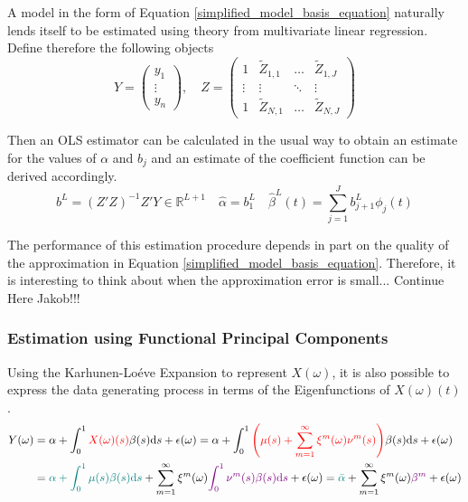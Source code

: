 \documentclass[11pt,twoside,a4paper]{article}
\begin{document}
	A model in the form of Equation \ref{simplified_model_basis_equation} naturally lends itself to be estimated using theory from multivariate linear regression. Define therefore the following objects
	\begin{equation}\label{regressor_mat_1}
		Y = \begin{pmatrix}
			y_1 \\ \vdots \\ y_n
		\end{pmatrix}, \quad
		Z = \begin{pmatrix}
			1 & \tilde{Z}_{1,1} & \dots & \tilde{Z}_{1,J} \\
			\vdots & \vdots & \ddots & \vdots \\
			1 & \tilde{Z}_{N,1} & \dots & \tilde{Z}_{N,J}
		\end{pmatrix}
	\end{equation}
	
	Then an OLS estimator can be calculated in the usual way to obtain an estimate for the values of $\alpha$ and $b_j$ and an estimate of the coefficient function can be derived accordingly.
	\begin{equation}
		b^L = \left(Z'Z\right)^{-1}Z'Y \in \mathbb{R}^{L+1} \quad \hat{\alpha} = b_{1}^{L} \quad \hat{\beta}^L(t) = \sum_{j = 1}^{J} b_{j+1}^L \phi_j(t)
	\end{equation}

	The performance of this estimation procedure depends in part on the quality of the approximation in Equation \ref{simplified_model_basis_equation}. Therefore, it is interesting to think about when the approximation error is small... {\color{red}Continue Here Jakob!!!}
	
	\subsubsection{Estimation using Functional Principal Components}\label{fpc_exp_transf}
	
	Using the Karhunen-Lo\'{e}ve Expansion to represent $X(\omega)$, it is also possible to express the data generating process in terms of the Eigenfunctions of $X(\omega)(t)$.
	\begin{equation}
		\begin{split}
			Y(\omega) &= \alpha + \int_{0}^{1} {\color{red}X(\omega)(s)} \beta(s) \mathrm{d}s + \epsilon(\omega)
			= \alpha + \int_{0}^{1} {\color{red}\left(\mu(s) + \sum_{m = 1}^{\infty} \xi^m(\omega) \nu^m(s)\right)} \beta(s) \mathrm{d}s + \epsilon(\omega)\\
			&= {\color{teal}\alpha + \int_{0}^{1} \mu(s) \beta(s) \mathrm{d}s} + \sum_{m = 1}^{\infty} \xi^m(\omega) {\color{violet}\int_{0}^{1} \nu^m(s) \beta(s) \mathrm{d}s} + \epsilon(\omega)
			= {\color{teal}\bar{\alpha}} + \sum_{m = 1}^{\infty} \xi^m(\omega) {\color{violet}\beta^m} + \epsilon(\omega)
		\end{split}
	\end{equation}
\end{document}
